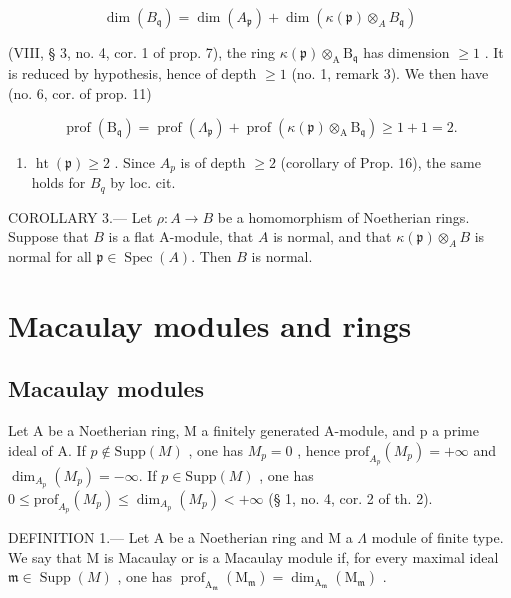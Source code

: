 \[
\dim (B _ {\mathfrak {q}}) = \dim (A _ {\mathfrak {p}}) + \dim (\kappa (\mathfrak {p}) \otimes_ {A} B _ {\mathfrak {q}})
\]

(VIII, § 3, no. 4, cor. 1 of prop. 7), the ring \(\kappa(\mathfrak{p})\otimes_{\mathrm{A}}\mathrm{B}_{\mathfrak{q}}\) has dimension \(\geqslant 1\) . It is reduced by hypothesis, hence of depth \(\geqslant 1\) (no. 1, remark 3). We then have (no. 6, cor. of prop. 11)

\[
\operatorname{prof} \left(\mathrm{B} _ {\mathfrak {q}}\right) = \operatorname{prof} \left(\Lambda_ {\mathfrak {p}}\right) + \operatorname{prof} \left(\kappa (\mathfrak {p}) \otimes_ {\mathrm{A}} \mathrm{B} _ {\mathfrak {q}}\right) \geqslant 1 + 1 = 2.
\]

\begin{enumerate}
\def\labelenumi{\arabic{enumi})}
\setcounter{enumi}{3}
\tightlist
\item
  \(\operatorname{ht}(\mathfrak{p}) \geqslant 2\) . Since \(A_{p}\) is of depth \(\geqslant 2\) (corollary of Prop. 16), the same holds for \(B_{q}\) by loc. cit.
\end{enumerate}

COROLLARY 3.--- Let \(\rho: A \to B\) be a homomorphism of Noetherian rings. Suppose that \(B\) is a flat A-module, that \(A\) is normal, and that \(\kappa(\mathfrak{p}) \otimes_A B\) is normal for all \(\mathfrak{p} \in \operatorname{Spec}(A)\). Then \(B\) is normal.

\section{Macaulay modules and rings}

\subsection{Macaulay modules}

Let A be a Noetherian ring, M a finitely generated A-module, and p a prime ideal of A. If \(p \notin \text{Supp}(M)\) , one has \(M_{p} = 0\) , hence \(\text{prof}_{A_{p}}(M_{p}) = +\infty\) and \(\dim_{A_{p}}(M_{p}) = -\infty\). If \(p \in \text{Supp}(M)\) , one has \(0 \leqslant \text{prof}_{A_{p}}(M_{p}) \leqslant \dim_{A_{p}}(M_{p}) < +\infty\) (§ 1, no. 4, cor. 2 of th. 2).

DEFINITION 1.--- Let A be a Noetherian ring and M a \(\Lambda\) module of finite type. We say that M is Macaulay or is a Macaulay module if, for every maximal ideal \(\mathfrak{m} \in \operatorname{Supp}(M)\) , one has \(\operatorname{prof}_{\mathrm{A}_{\mathfrak{m}}}\left(\mathrm{M}_{\mathfrak{m}}\right) = \dim_{\mathrm{A}_{\mathfrak{m}}}\left(\mathrm{M}_{\mathfrak{m}}\right)\) .

